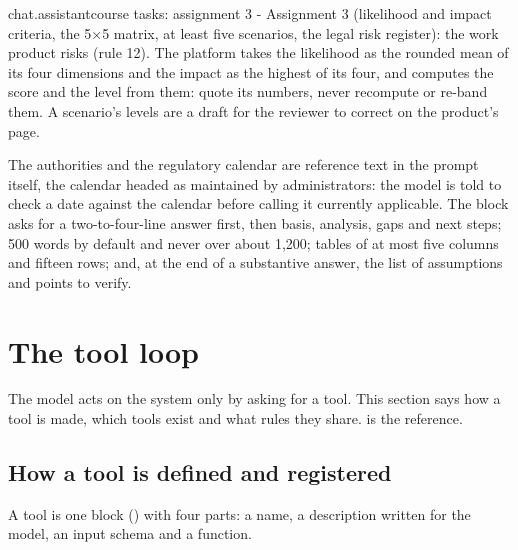 \begin{promptexcerpt}{chat.assistant}{course tasks: assignment 3}
- Assignment 3 (likelihood and impact criteria, the 5×5 matrix, at least five scenarios, the legal risk register): the work product risks (rule 12). The platform takes the likelihood as the rounded mean of its four dimensions and the impact as the highest of its four, and computes the score and the level from them: quote its numbers, never recompute or re-band them. A scenario's levels are a draft for the reviewer to correct on the product's page.
\end{promptexcerpt}

The authorities and the regulatory calendar are reference text in the prompt itself, the
calendar headed as maintained by administrators: the model is told to check a date against the
calendar before calling it currently applicable. The  block asks for a two-to-four-line answer first, then
basis, analysis, gaps and next steps; 500 words by default and never over about 1,200; tables
of at most five columns and fifteen rows; and, at the end of a substantive answer, the list of
assumptions and points to verify.


\section{The tool loop}\label{sec:chat:tools}

The model acts on the system only by asking for a tool. This section says how a tool is made,
which tools exist and what rules they share.  is the reference.

\subsection{How a tool is defined and registered}

A tool is one  block () with four parts: a name, a
description written for the model, an input schema and a  function.


